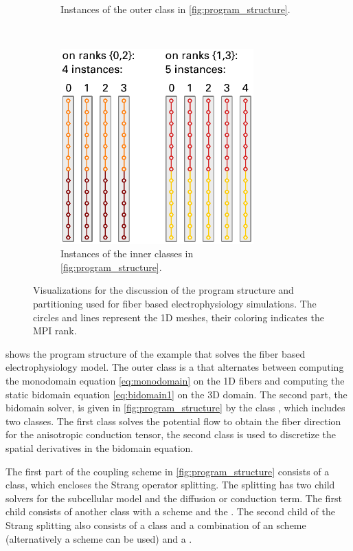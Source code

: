 \begin{figure}
\begin{subfigure}[t]{0.48\textwidth}
    \caption{Instances of the outer  class in \cref{fig:program_structure}.}%
    \label{fig:fiber_partitioning1}%
  \end{subfigure}
  \,
  \begin{subfigure}[t]{0.48\textwidth}%
    \centering%
    \includegraphics[height=7.5cm]{images/implementation/fiber_partitioning2.pdf}
    \caption{Instances of the inner \break{} classes in \cref{fig:program_structure}.}%
    \label{fig:fiber_partitioning2}%
  \end{subfigure}
  \caption{Visualizations for the discussion of the program structure and partitioning used for fiber based electrophysiology simulations. The circles and lines represent the 1D meshes, their coloring indicates the MPI rank.}%
  \label{fig:partitioning_program}%
\end{figure}%

 shows the program structure of the example that solves the fiber based electrophysiology model. The outer class is a  that alternates between computing the monodomain equation \cref{eq:monodomain} on the 1D fibers and computing the static bidomain equation \cref{eq:bidomain1} on the 3D domain. The second part, the bidomain solver, is given in \cref{fig:program_structure} by the class , which includes two  classes. The first class solves the potential flow to obtain the fiber direction for the anisotropic conduction tensor, the second class is used to discretize the spatial derivatives in the bidomain equation.

The first part of the coupling scheme in \cref{fig:program_structure} consists of a  class, which encloses the Strang operator splitting. The splitting has two child solvers for the subcellular model and the diffusion or conduction term. The first child consists of another  class with a  scheme and the \nolinebreak.
The second child of the Strang splitting also consists of a  class and a combination of an  scheme (alternatively a  scheme can be used) and a .

